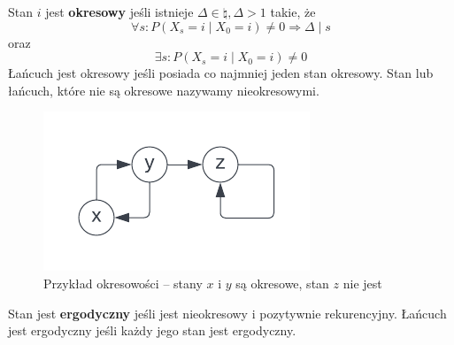 \begin{definition}
    Stan \(i\) jest \textbf{okresowy} jeśli istnieje \(\Delta \in \natural, \Delta > 1 \) takie, że
        \[
            \forall s : P(X_s = i \mid X_0 = i) \neq 0 \Rightarrow \Delta \mid s  
        \]
        oraz
        \[
            \exists s : P(X_s = i \mid X_0 = i) \neq 0
        \]
    Łańcuch jest okresowy jeśli posiada co najmniej jeden stan okresowy.
    Stan lub łańcuch, które nie są okresowe nazywamy nieokresowymi.
\end{definition}
\begin{figure}[H]
    \centering
    \includegraphics{img/markov-chains/periodic-states-example.png}
    \caption{Przykład okresowości -- stany \( x \) i \( y \) są okresowe, stan \( z \) nie jest}
\end{figure}


\begin{definition}
   Stan jest \textbf{ergodyczny} jeśli jest nieokresowy i pozytywnie rekurencyjny.
   Łańcuch jest ergodyczny jeśli każdy jego stan jest ergodyczny.
\end{definition}

